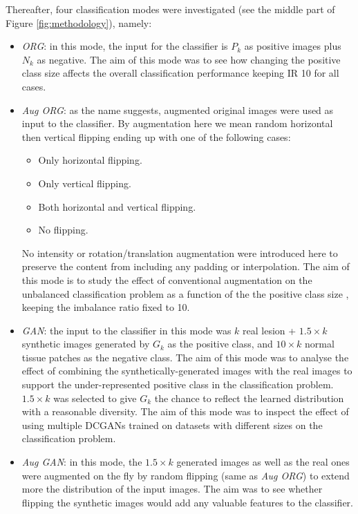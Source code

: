 \documentclass[final,3p,twocolumn,authoryear,sort&compress,times]{maia}
\begin{document}
Thereafter, four classification modes were investigated (see the middle part of Figure \ref{fig:methodology}), namely:
\begin{itemize}
    \item \textit{ORG}: in this mode, the input for the classifier is $P_k$ as positive images plus $N_k$ as negative. The aim of this mode was to see how changing the positive class size affects the overall classification performance keeping IR 10 for all cases.
    \item \textit{Aug ORG}: as the name suggests, augmented original images were used as input to the classifier. By augmentation here we mean random horizontal then vertical flipping ending up with one of the following cases:
\begin{itemize}
    \item Only horizontal flipping.
    \item Only vertical flipping.
    \item Both horizontal and vertical flipping.
    \item No flipping.
\end{itemize} 
No intensity or rotation/translation augmentation were introduced here to preserve the content from including any padding or interpolation. The aim of this mode is to study the effect of conventional augmentation on the unbalanced classification problem as a function of the the positive class size , keeping the imbalance ratio fixed to 10.
    \item \textit{GAN}: the input to the classifier in this mode was $k$ real lesion + $1.5 \times k$ synthetic images generated by $G_k$ as the positive class, and $10 \times k$ normal tissue patches as the negative class. The aim of this mode was to analyse the effect of combining the synthetically-generated images with the real images to support the under-represented positive class in the classification problem. $1.5 \times k$ was selected to give $G_k$ the chance to reflect the learned distribution with a reasonable diversity. The aim of this mode was to inspect the effect of using multiple DCGANs trained on datasets with different sizes on the classification problem.
    \item \textit{Aug GAN}: in this mode, the $1.5\times k$ generated images as well as the real ones were augmented on the fly by random flipping (same as \textit{Aug ORG}) to extend more the distribution of the input images. The aim was to see whether flipping the synthetic images would add any valuable features to the classifier.
\end{itemize}
\end{document}
